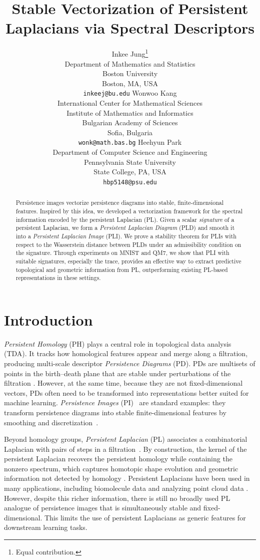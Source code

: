 \documentclass{article}
\title[Stable Vectorization of Persistent Laplacians via Spectral Descriptors]{Stable Vectorization of Persistent Laplacians via Spectral Descriptors}
\author[Jung et al.]{%
  Inkee Jung\thanks{Equal contribution.}\\
  Department of Mathematics and Statistics\\
  Boston University\\
  Boston, MA, USA \\
  \texttt{inkeej@bu.edu}\And
  Wonwoo Kang\footnotemark[1]\\
  International Center for Mathematical Sciences \\ Institute of Mathematics and Informatics\\
  Bulgarian Academy of Sciences\\
  Sofia, Bulgaria \\
  \texttt{wonk@math.bas.bg}\And
  Heehyun Park\footnotemark[1]\\
  Department of Computer Science and Engineering \\ Pennsylvania State University \\
  State College, PA, USA \\
  \texttt{hbp5148@psu.edu}
}
\begin{document}
\maketitle


\begin{abstract}
Persistence images vectorize persistence diagrams into stable, finite-dimensional features. Inspired by this idea, we developed a vectorization framework for the spectral information encoded by the persistent Laplacian (PL). Given a scalar \emph{signature} of a persistent Laplacian, we form a \emph{Persistent Laplacian Diagram} (PLD) and smooth it into a \emph{Persistent Laplacian Image} (PLI). We prove a stability theorem for PLIs with respect to the Wasserstein distance between PLDs under an admissibility condition on the signature. Through experiments on MNIST and QM7, we show that PLI with suitable signatures, especially the trace, provides an effective way to extract predictive topological and geometric information from PL, outperforming existing PL-based representations in these settings.
\end{abstract}

\section{Introduction}
\label{sec:intro}
\emph{Persistent Homology} (PH) plays a central role in topological data analysis (TDA). It tracks how homological features appear and merge along a filtration, producing multi-scale descriptor \emph{Persistence Diagrams} (PD). PDs are multisets of points in the birth--death plane that are stable under perturbations of the filtration \cite{CEH07, ELZ02}. However, at the same time, because they are not fixed-dimensional vectors, PDs often need to be transformed into representations better suited for machine learning. \emph{Persistence Images} (PI)~\cite{PI17} are standard examples: they transform persistence diagrams into stable finite-dimensional features by smoothing and discretization~\cite{PI17}.
 
Beyond homology groups, \emph{Persistent Laplacian} (PL) associates a combinatorial Laplacian with pairs of steps in a filtration~\cite{davies2023persistent,memoli2022persistent,WNW20,WW25}. By construction, the kernel of the persistent Laplacian recovers the persistent homology while containing the nonzero spectrum, which captures homotopic shape evolution and geometric information not detected by homology \cite{chen2022persistent, memoli2022persistent}. Persistent Laplacians have been used in many applications, including biomolecule data and analyzing point cloud data \cite{chen2022persistent,wei2023persistent,WW25}. However, despite this richer information, there is still no broadly used PL analogue of persistence images that is simultaneously stable and fixed-dimensional. This limits the use of persistent Laplacians as generic features for downstream learning tasks.
\end{document}
